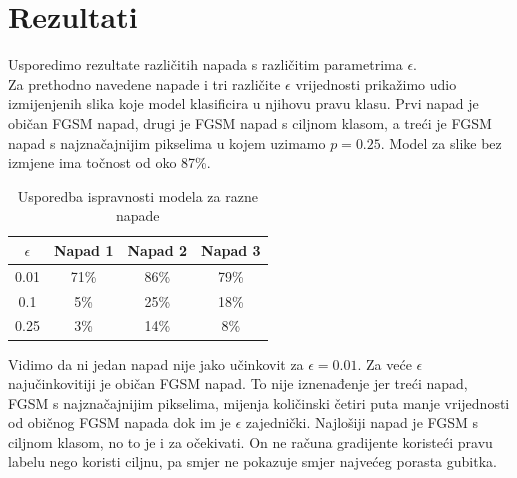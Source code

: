 \section{Rezultati}

Usporedimo rezultate različitih napada s različitim parametrima $\epsilon$. \\

Za prethodno navedene napade i tri različite $\epsilon$ vrijednosti prikažimo udio izmijenjenih slika koje model klasificira u njihovu pravu klasu. Prvi napad je običan FGSM napad, drugi je FGSM napad s ciljnom klasom, a treći je FGSM napad s najznačajnijim pikselima u kojem uzimamo $p = 0.25$. Model za slike bez izmjene ima točnost od oko 87\%.

\begin{table}[H]
	\centering
	\begin{tabular}{||c || c | c | c||} 
		\hline
		$\epsilon$ & Napad 1 & Napad 2 & Napad 3 \\ [0.5ex] 
		\hline\hline
		0.01 & 71\% & 86\% & 79\% \\ 
		0.1 & 5\% & 25\% & 18\% \\
		0.25 & 3\% & 14\% & 8\% \\ [1ex] 
		\hline
	\end{tabular}
	\caption{Usporedba ispravnosti modela za razne napade}
\end{table}

Vidimo da ni jedan napad nije jako učinkovit za $\epsilon = 0.01$. Za veće $\epsilon$ najučinkovitiji je običan FGSM napad. To nije iznenađenje jer treći napad, FGSM s najznačajnijim pikselima, mijenja količinski četiri puta manje vrijednosti od običnog FGSM napada dok im je $\epsilon$ zajednički. Najlošiji napad je FGSM s ciljnom klasom, no to je i za očekivati. On ne računa gradijente koristeći pravu labelu nego koristi ciljnu, pa smjer ne pokazuje smjer najvećeg porasta gubitka.
